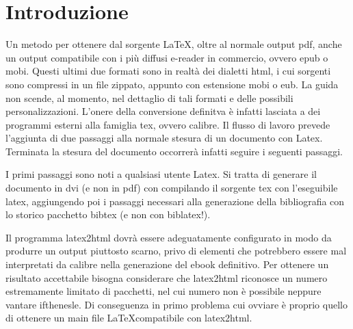 

\chapter{Introduzione}

Un metodo per ottenere dal sorgente \LaTeX, oltre al normale output pdf, anche un 
output compatibile con i più diffusi e-reader in commercio, ovvero epub o mobi. 
Questi ultimi due formati sono in realtà dei dialetti html, i cui sorgenti sono 
compressi in un file zippato, appunto con estensione mobi o eub. La guida non 
scende, al momento, nel dettaglio di tali formati e delle possibili 
personalizzazioni. L'onere della conversione definitva è infatti lasciata a dei 
programmi esterni alla famiglia tex, ovvero calibre. Il flusso di lavoro
prevede l'aggiunta di due passaggi alla normale stesura di un documento con 
Latex. Terminata la stesura del documento occorrerà infatti seguire i seguenti passaggi.

\begin{comment}
\begin{center}
\begin{forest}
[latex
[bibtex
[latex
[latex
[latex2html
[calibre]]]]]]
\end{forest}
\end{center}
\end{comment}

I primi passaggi sono noti a qualsiasi utente Latex. Si tratta di generare il 
documento in dvi (e non in pdf) con compilando il sorgente tex con l'eseguibile 
latex, aggiungendo poi i passaggi necessari alla generazione della bibliografia 
con lo storico pacchetto bibtex (e non con biblatex!).

Il programma latex2html dovrà essere adeguatamente configurato in modo da
produrre
un output piuttosto scarno, privo di elementi che potrebbero essere mal 
interpretati da calibre nella generazione del ebook definitivo. Per ottenere un 
risultato accettabile bisogna considerare che latex2html riconosce un numero
estremamente limitato di pacchetti, nel cui numero non è possibile neppure 
vantare ifthenesle. Di conseguenza in primo problema cui ovviare è proprio 
quello di ottenere un main file \LaTeX compatibile con latex2html.



